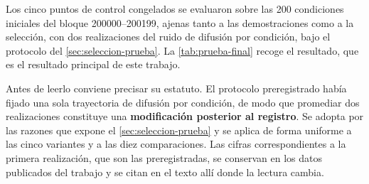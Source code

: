Los cinco puntos de control congelados se evaluaron sobre las \num{200} condiciones
iniciales del bloque \numrange{200000}{200199}, ajenas tanto a las demostraciones como a la
selecci\'on, con dos realizaciones del ruido de difusi\'on por condici\'on, bajo el
protocolo del \cref{sec:seleccion-prueba}. La \cref{tab:prueba-final} recoge el resultado,
que es el resultado principal de este trabajo.

Antes de leerlo conviene precisar su estatuto. El protocolo preregistrado hab\'ia fijado una
sola trayectoria de difusi\'on por condici\'on, de modo que promediar dos realizaciones
constituye una \textbf{modificaci\'on posterior al registro}. Se adopta por las razones que
expone el \cref{sec:seleccion-prueba} y se aplica de forma uniforme a las cinco variantes y
a las diez comparaciones. Las cifras correspondientes a la primera realizaci\'on, que son
las preregistradas, se conservan en los datos publicados del trabajo y se citan en el texto
all\'i donde la lectura cambia.

